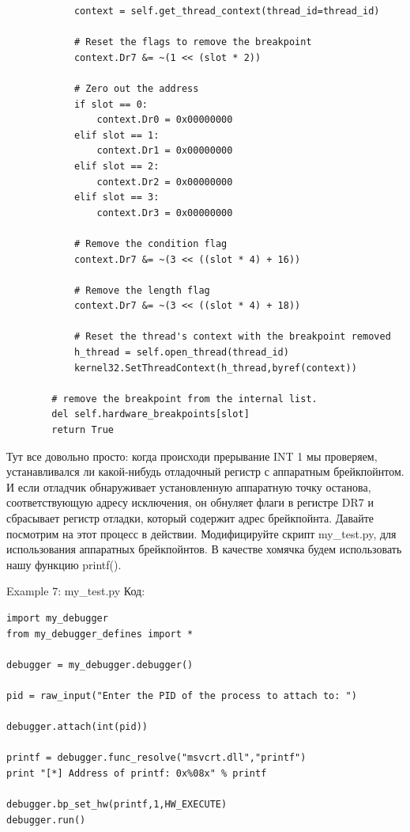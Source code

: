 \documentclass[12pt, a4paper, oneside]{book}
\begin{document}
\begin{verbatim}
            context = self.get_thread_context(thread_id=thread_id)

            # Reset the flags to remove the breakpoint
            context.Dr7 &= ~(1 << (slot * 2))

            # Zero out the address
            if slot == 0:
                context.Dr0 = 0x00000000
            elif slot == 1:
                context.Dr1 = 0x00000000
            elif slot == 2:
                context.Dr2 = 0x00000000
            elif slot == 3:
                context.Dr3 = 0x00000000

            # Remove the condition flag
            context.Dr7 &= ~(3 << ((slot * 4) + 16))

            # Remove the length flag
            context.Dr7 &= ~(3 << ((slot * 4) + 18))

            # Reset the thread's context with the breakpoint removed
            h_thread = self.open_thread(thread_id)
            kernel32.SetThreadContext(h_thread,byref(context))

        # remove the breakpoint from the internal list.
        del self.hardware_breakpoints[slot]
        return True
\end{verbatim}

Тут все довольно просто: когда происходи прерывание INT 1 мы проверяем, устанавливался ли какой-нибудь отладочный регистр с аппаратным брейкпойнтом. И если отладчик обнаруживает установленную аппаратную точку останова, соответствующую адресу исключения, он обнуляет флаги в регистре DR7 и сбрасывает регистр отладки, который содержит адрес брейкпойнта. Давайте посмотрим на этот процесс в действии. Модифицируйте скрипт my\_test.py, для использования аппаратных брейкпойнтов. В качестве хомячка будем использовать нашу функцию printf().

Example 7: my\_test.py
Код:
\begin{verbatim}
import my_debugger
from my_debugger_defines import *

debugger = my_debugger.debugger()

pid = raw_input("Enter the PID of the process to attach to: ")

debugger.attach(int(pid))

printf = debugger.func_resolve("msvcrt.dll","printf")
print "[*] Address of printf: 0x%08x" % printf

debugger.bp_set_hw(printf,1,HW_EXECUTE)
debugger.run()
\end{verbatim}
\end{document}
